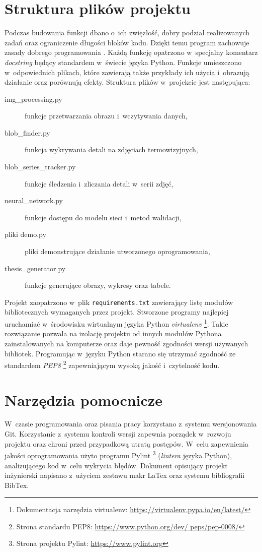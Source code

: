 \section{Struktura plików projektu}
Podczas budowania funkcji dbano o~ich zwięzłość, dobry podział realizowanych
zadań oraz ograniczenie długości bloków kodu.
Dzięki temu program zachowuje zasady dobrego programowania \cite{martin_code}.
Każdą funkcję opatrzono w~specjalny komentarz \emph{docstring} będący standardem
w~świecie języka Python.
Funkcje umieszczono w~odpowiednich plikach, które zawierają także przykłady ich
użycia i~obrazują działanie oraz porównują efekty.
Struktura plików w~projekcie jest następująca:
\begin{description}
    \item[img\_processing.py]
        funkcje przetwarzania obrazu i~wczytywania danych,
    \item[blob\_finder.py]
        funkcja wykrywania detali na zdjęciach termowizyjnych,
    \item[blob\_series\_tracker.py]
        funkcje śledzenia i~zliczania detali w~serii zdjęć,
    \item[neural\_network.py]
        funkcje dostępu do modelu sieci i~metod walidacji,
    \item[pliki demo.py]
        pliki demonstrujące działanie utworzonego oprogramowania,
    \item[thesis\_generator.py]
        funkcje generujące obrazy, wykresy oraz tabele.
\end{description}

Projekt zaopatrzono w~plik \texttt{requirements.txt} zawierający listę modułów
bibliotecznych wymaganych przez projekt.
Stworzone programy najlepiej uruchamiać w~środowisku wirtualnym języka Python
\emph{virtualenv}%
\footnote{%
    Dokumentacja narzędzia virtualenv:
    \url{https://virtualenv.pypa.io/en/latest/}}.
Takie rozwiązanie pozwala na izolację projektu od innych modułów Pythona
zainstalowanych na komputerze oraz daje pewność zgodności wersji używanych
bibliotek.
Programując w~języku Python starano się utrzymać zgodność ze standardem
\emph{PEP8}%
\footnote{%
    Strona standardu PEP8: \url{https://www.python.org/dev/ peps/pep-0008/}}
zapewniającym wysoką jakość i~czytelność kodu.

\section{Narzędzia pomocnicze}
W~czasie programowania oraz pisania pracy korzystano z~systemu wersjonowania
Git.
Korzystanie z~systemu kontroli wersji zapewnia porządek w~rozwoju projektu oraz
chroni przed przypadkową utratą postępów.
W~celu zapewnienia jakości oprogramowania użyto programu Pylint%
\footnote{%
    Strona projektu Pylint: \url{https://www.pylint.org}}
(\emph{lintera} języka Python), analizującego kod w~celu wykrycia błędów.
Dokument opisujący projekt inżynierski napisano z~użyciem zestawu makr LaTex
oraz systemu bibliografii BibTex.
